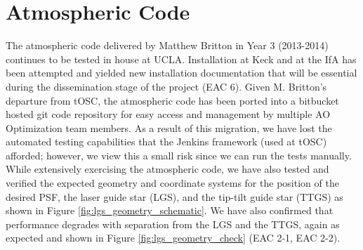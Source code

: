 \section{Atmospheric Code}
\label{sec:atmospheric_code}

The atmospheric code delivered by Matthew Britton in Year 3 (2013-2014) continues to be tested in house at UCLA. Installation at Keck and at the IfA has been attempted and yielded new installation documentation that will be essential during the dissemination stage of the project (EAC 6). Given M. Britton’s departure from tOSC, the atmospheric code has been ported into a bitbucket hosted git code repository for easy access and management by multiple AO Optimization team members. As a result of this migration, we have lost the automated testing capabilities that the Jenkins framework (used at tOSC) afforded; however, we view this a small risk since we can run the tests manually. While extensively exercising the atmospheric code, we have also tested and verified the expected geometry and coordinate systems for the position of the desired PSF, the laser guide star (LGS), and the tip-tilt guide star (TTGS) as shown in Figure \ref{fig:lgs_geometry_schematic}. We have also confirmed that performance degrades with separation from the LGS and the TTGS, again as expected and shown in Figure \ref{fig:lgs_geometry_check} (EAC 2-1, EAC 2-2).

